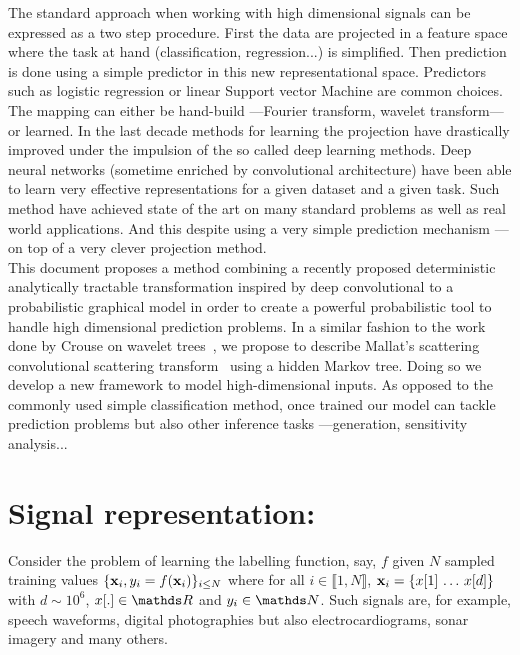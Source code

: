 \documentclass[a4paper,11pt]{report}
\begin{document}
	The standard approach when working with high dimensional signals can be expressed as a two step procedure. First the data are projected in a feature space where the task at hand (classification, regression...) is simplified. Then prediction is done using a simple predictor in this new representational space. Predictors such as logistic regression or linear Support vector Machine are common choices. The mapping can either be hand-build ---\eg Fourier transform, wavelet transform--- or learned. In the last decade methods for learning the projection have drastically improved under the impulsion of the so called deep learning methods. Deep neural networks (sometime enriched by convolutional architecture) have been able to learn very effective representations for a given dataset and a given task. Such method have achieved state of the art on many standard problems as well as real world applications. And this despite using a very simple prediction mechanism ---on top of a very clever projection method.\\
	
	This document proposes a method combining a recently proposed deterministic analytically tractable transformation inspired by deep convolutional to a probabilistic graphical model in order to create a powerful probabilistic tool to handle high dimensional prediction problems. In a similar fashion to the work done by Crouse on wavelet trees~\citep{crouse1998wavelet}, we propose to describe Mallat's scattering convolutional scattering transform~\citep{bruna2010classification} using a hidden Markov tree. Doing so we develop a new framework to model high-dimensional inputs. As opposed to the commonly used simple classification method, once trained our model can tackle prediction problems but also other inference tasks ---\eg generation, sensitivity analysis...
	
	\section{Signal representation:}
		\label{sec:Intro/Need}
				
		Consider the problem of learning the labelling function, say, $f$ given $N$ sampled training values $\{{\bf x}_{i}, y_{i}=f({\bf x}_{i})\}_{i\leq N}$ where  for all $i \in \llbracket 1 , N \rrbracket$, ${\bf x}_{i} =\{ x[1] \, \dots \, x[d] \}$ with $d \sim 10^{6}$, $x[.] \in \dsR$ and $y_{i} \in \dsN$. Such signals are, for example, speech waveforms, digital photographies but also electrocardiograms, sonar imagery and many others.\\
\end{document}
